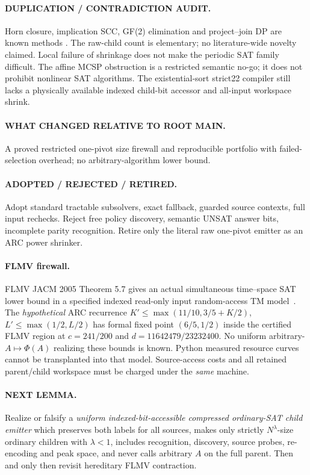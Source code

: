 \documentclass[11pt]{article}
\begin{document}
\paragraph{DUPLICATION / CONTRADICTION AUDIT.}
Horn closure, implication SCC, GF(2) elimination and project--join
DP are known methods \cite{Aspvall1979,Dowling1984,Dechter1999,Dreier2024}.
The raw-child count is elementary; no literature-wide novelty claimed.
Local failure of shrinkage does not make the periodic SAT family
difficult. The affine MCSP obstruction is a restricted semantic no-go;
it does not prohibit nonlinear SAT algorithms. The existential-sort
strict22 compiler still lacks a physically available indexed child-bit
accessor and all-input workspace shrink.
\paragraph{WHAT CHANGED RELATIVE TO ROOT MAIN.}
A proved restricted one-pivot size firewall and reproducible portfolio
with failed-selection overhead; no arbitrary-algorithm lower bound.
\paragraph{ADOPTED / REJECTED / RETIRED.}
Adopt standard tractable subsolvers, exact fallback, guarded source
contexts, full input rechecks. Reject free policy discovery, semantic
UNSAT answer bits, incomplete parity recognition. Retire only the
literal raw one-pivot emitter as an ARC power shrinker.
\paragraph{FLMV firewall.}
FLMV JACM 2005 Theorem 5.7 gives an actual simultaneous time--space
SAT lower bound in a specified indexed read-only input random-access TM
model~\cite{FLMV2005}. The \emph{hypothetical} ARC recurrence
$K'\le\max(11/10,3/5+K/2)$,
$L'\le\max(1/2,L/2)$ has formal fixed point $(6/5,1/2)$ inside
the certified FLMV region at $c=241/200$ and
$d=11642479/23232400$. No uniform arbitrary-$A\mapsto\Phi(A)$
realizing these bounds is known. Python measured resource curves cannot
be transplanted into that model. Source-access costs and all retained
parent/child workspace must be charged under the \emph{same} machine.
\paragraph{NEXT LEMMA.}
Realize or falsify a \emph{uniform indexed-bit-accessible compressed
ordinary-SAT child emitter} which preserves both labels for all sources,
makes only strictly $N^\lambda$-size ordinary children with $\lambda<1$,
includes recognition, discovery, source probes, re-encoding and peak
space, and never calls arbitrary $A$ on the full parent.
Then and only then revisit hereditary FLMV contraction.
\end{document}
